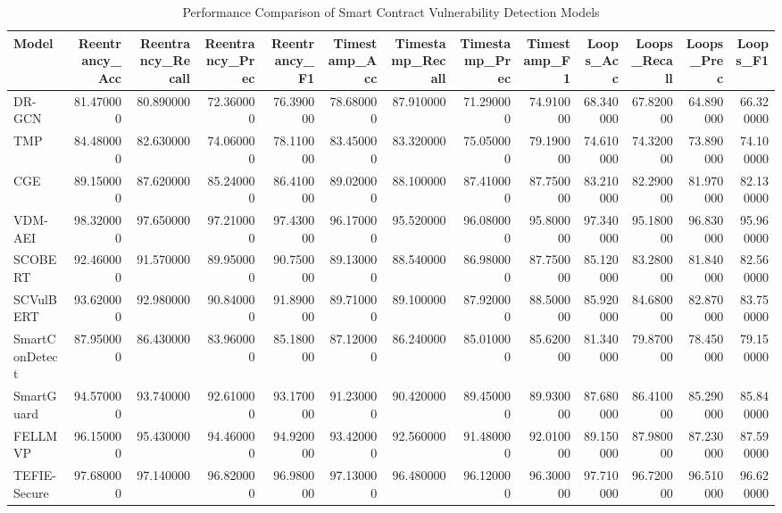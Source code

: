 \begin{table}[t]
\centering
\begin{tabular}{lrrrrrrrrrrrr}
\toprule
Model & Reentrancy_Acc & Reentrancy_Recall & Reentrancy_Prec & Reentrancy_F1 & Timestamp_Acc & Timestamp_Recall & Timestamp_Prec & Timestamp_F1 & Loops_Acc & Loops_Recall & Loops_Prec & Loops_F1 \\
\midrule
DR-GCN & 81.470000 & 80.890000 & 72.360000 & 76.390000 & 78.680000 & 87.910000 & 71.290000 & 74.910000 & 68.340000 & 67.820000 & 64.890000 & 66.320000 \\
TMP & 84.480000 & 82.630000 & 74.060000 & 78.110000 & 83.450000 & 83.320000 & 75.050000 & 79.190000 & 74.610000 & 74.320000 & 73.890000 & 74.100000 \\
CGE & 89.150000 & 87.620000 & 85.240000 & 86.410000 & 89.020000 & 88.100000 & 87.410000 & 87.750000 & 83.210000 & 82.290000 & 81.970000 & 82.130000 \\
VDM-AEI & 98.320000 & 97.650000 & 97.210000 & 97.430000 & 96.170000 & 95.520000 & 96.080000 & 95.800000 & 97.340000 & 95.180000 & 96.830000 & 95.960000 \\
SCOBERT & 92.460000 & 91.570000 & 89.950000 & 90.750000 & 89.130000 & 88.540000 & 86.980000 & 87.750000 & 85.120000 & 83.280000 & 81.840000 & 82.560000 \\
SCVulBERT & 93.620000 & 92.980000 & 90.840000 & 91.890000 & 89.710000 & 89.100000 & 87.920000 & 88.500000 & 85.920000 & 84.680000 & 82.870000 & 83.750000 \\
SmartConDetect & 87.950000 & 86.430000 & 83.960000 & 85.180000 & 87.120000 & 86.240000 & 85.010000 & 85.620000 & 81.340000 & 79.870000 & 78.450000 & 79.150000 \\
SmartGuard & 94.570000 & 93.740000 & 92.610000 & 93.170000 & 91.230000 & 90.420000 & 89.450000 & 89.930000 & 87.680000 & 86.410000 & 85.290000 & 85.840000 \\
FELLMVP & 96.150000 & 95.430000 & 94.460000 & 94.920000 & 93.420000 & 92.560000 & 91.480000 & 92.010000 & 89.150000 & 87.980000 & 87.230000 & 87.590000 \\
TEFIE-Secure & 97.680000 & 97.140000 & 96.820000 & 96.980000 & 97.130000 & 96.480000 & 96.120000 & 96.300000 & 97.710000 & 96.720000 & 96.510000 & 96.620000 \\
\bottomrule
\end{tabular}
\caption{Performance Comparison of Smart Contract Vulnerability Detection Models}
\label{tab:perf}
\end{table}
